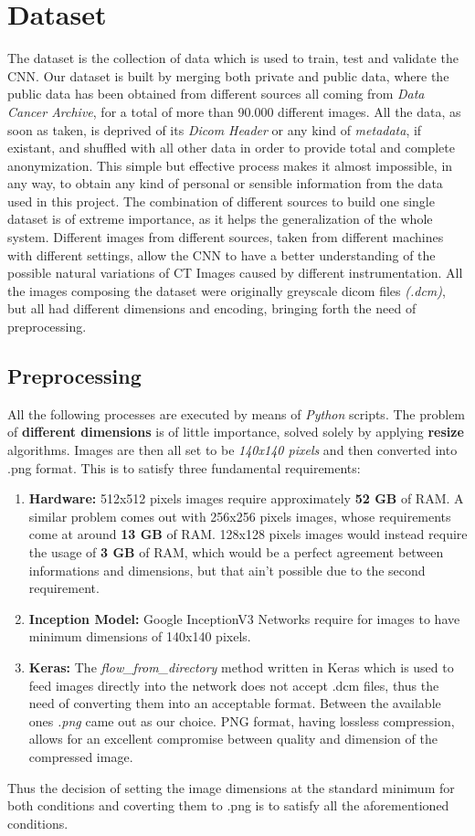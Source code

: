 \documentclass[../main.tex]{subfiles}
\begin{document}
\section{Dataset}
The dataset is the collection of data which is used to train, test and validate the CNN. Our dataset is built by merging both private and public data, where the public data has been obtained from different sources all coming from \textit{Data Cancer Archive}, for a total of more than 90.000 different images. All the data, as soon as taken, is deprived of its \textit{Dicom Header} or any kind of \textit{metadata}, if existant, and shuffled with all other data in order to provide total and complete anonymization. This simple but effective process makes it almost impossible, in any way, to obtain any kind of personal or sensible information from the data used in this project.
The combination of different sources to build one single dataset is of extreme importance, as it helps the generalization of the whole system. Different images from different sources, taken from different machines with different settings, allow the CNN to have a better understanding of the possible natural variations of CT Images caused by different instrumentation.
All the images composing the dataset were originally greyscale dicom files \textit{(.dcm)}, but all had different dimensions and encoding, bringing forth the need of preprocessing.
\vspace{5mm}
\subsection{Preprocessing}
All the following processes are executed by means of \textit{Python} scripts. The problem of \textbf{different dimensions} is of little importance, solved solely by applying \textbf{resize} algorithms. Images are then all set to be \textit{140x140 pixels} and then converted into .png format. This is to satisfy three fundamental requirements:
\begin{enumerate}
	\item \textbf{Hardware:} 512x512 pixels images require approximately \textbf{52 GB} of RAM. A similar problem comes out with 256x256 pixels images, whose requirements come at around \textbf{13 GB} of RAM. 128x128 pixels images would instead require the usage of \textbf{3 GB} of RAM, which would be a perfect agreement between informations and dimensions, but that ain't possible due to the second requirement.
	\item \textbf{Inception Model:} Google InceptionV3 Networks require for images to have minimum dimensions of 140x140 pixels.
	\item \textbf{Keras:} The \textit{flow_from_directory} method written in Keras which is used to feed images directly into the network does not accept .dcm files, thus the need of converting them into an acceptable format. Between the available ones \textit{.png} came out as our choice. PNG format, having lossless compression, allows for an excellent compromise between quality and dimension of the compressed image.
\end{enumerate}
Thus the decision of setting the image dimensions at the standard minimum for both conditions and coverting them to .png is to satisfy all the aforementioned conditions.
\end{document}
